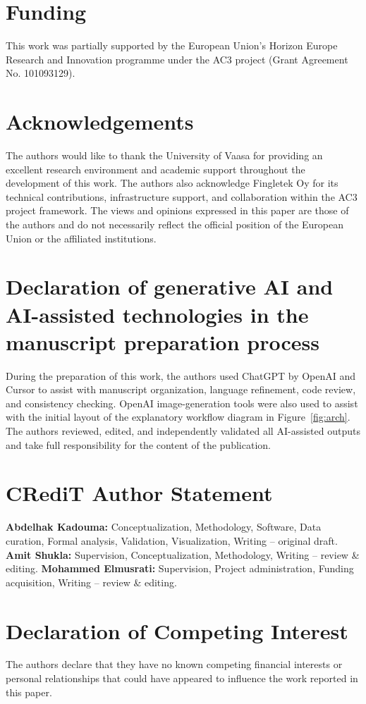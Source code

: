 \documentclass[a4paper,fleqn]{cas-dc}
\begin{document}
\section*{Funding}

This work was partially supported by the European Union’s Horizon Europe Research and Innovation programme under the AC3 project (Grant Agreement No. 101093129).

\section*{Acknowledgements}

The authors would like to thank the University of Vaasa for providing an excellent research environment and academic support throughout the development of this work. The authors also acknowledge Fingletek Oy for its technical contributions, infrastructure support, and collaboration within the AC3 project framework. The views and opinions expressed in this paper are those of the authors and do not necessarily reflect the official position of the European Union or the affiliated institutions.

\section*{Declaration of generative AI and AI-assisted technologies in the
manuscript preparation process}

During the preparation of this work, the authors used ChatGPT by OpenAI and
Cursor to assist with manuscript organization, language refinement, code review,
and consistency checking. OpenAI image-generation tools were also used to assist
with the initial layout of the explanatory workflow diagram in Figure~\ref{fig:arch}.
The authors reviewed, edited, and independently validated all AI-assisted
outputs and take full responsibility for the content of the publication.

\section*{CRediT Author Statement}
\textbf{Abdelhak Kadouma:} Conceptualization, Methodology, Software, Data
curation, Formal analysis, Validation, Visualization, Writing -- original draft.
\textbf{Amit Shukla:} Supervision, Conceptualization, Methodology, Writing --
review \& editing.
\textbf{Mohammed Elmusrati:} Supervision, Project administration, Funding
acquisition, Writing -- review \& editing.

\section*{Declaration of Competing Interest}

The authors declare that they have no known competing financial interests or personal relationships that could have appeared to influence the work reported in this paper.

\FloatBarrier


\end{document}
